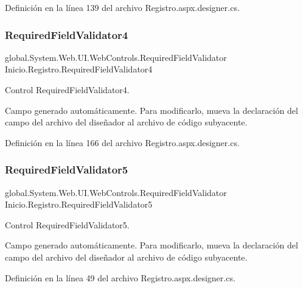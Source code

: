 Definición en la línea 139 del archivo Registro.\+aspx.\+designer.\+cs.

\mbox{\label{classInicio_1_1Registro_a50ab8ab72bcd7c32903c8af8acb766ea}} 
\subsubsection{\texorpdfstring{RequiredFieldValidator4}{RequiredFieldValidator4}}
{\footnotesize\ttfamily global.\+System.\+Web.\+U\+I.\+Web\+Controls.\+Required\+Field\+Validator Inicio.\+Registro.\+Required\+Field\+Validator4\hspace{0.3cm}{\ttfamily [protected]}}



Control Required\+Field\+Validator4. 

Campo generado automáticamente. Para modificarlo, mueva la declaración del campo del archivo del diseñador al archivo de código subyacente. 

Definición en la línea 166 del archivo Registro.\+aspx.\+designer.\+cs.

\mbox{\label{classInicio_1_1Registro_af4f83864caf67319997d2b41fb4298b2}} 
\subsubsection{\texorpdfstring{RequiredFieldValidator5}{RequiredFieldValidator5}}
{\footnotesize\ttfamily global.\+System.\+Web.\+U\+I.\+Web\+Controls.\+Required\+Field\+Validator Inicio.\+Registro.\+Required\+Field\+Validator5\hspace{0.3cm}{\ttfamily [protected]}}



Control Required\+Field\+Validator5. 

Campo generado automáticamente. Para modificarlo, mueva la declaración del campo del archivo del diseñador al archivo de código subyacente. 

Definición en la línea 49 del archivo Registro.\+aspx.\+designer.\+cs.

